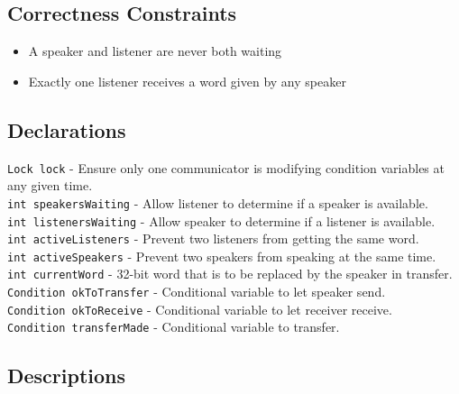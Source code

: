 \documentclass{article}
\begin{document}
\subsection{Correctness Constraints}
\begin{itemize}
\item A speaker and listener are never both waiting
\item Exactly one listener receives a word given by any speaker
\end{itemize}

\subsection{Declarations}
\texttt{Lock lock} - Ensure only one communicator is modifying condition variables at any given time. \\
\texttt{int speakersWaiting} - Allow listener to determine if a speaker is available. \\
\texttt{int listenersWaiting} - Allow speaker to determine if a listener is available. \\
\texttt{int activeListeners} - Prevent two listeners from getting the same word. \\
\texttt{int activeSpeakers} - Prevent two speakers from speaking at the same time. \\
\texttt{int currentWord} - 32-bit word that is to be replaced by the speaker in transfer. \\
\texttt{Condition okToTransfer} - Conditional variable to let speaker send. \\
\texttt{Condition okToReceive} - Conditional variable to let receiver receive. \\
\texttt{Condition transferMade} - Conditional variable to transfer.

\subsection{Descriptions}
\end{document}
